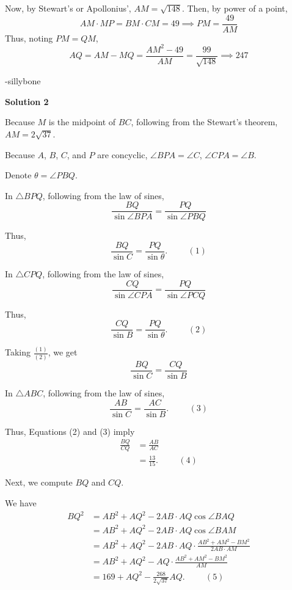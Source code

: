 \begin{enumerate}
 Now, by Stewart's or Apollonius', $AM = \sqrt{148}$. Then, by power of a point, 
 \[AM \cdot MP = BM \cdot CM = 49 \implies PM = \frac{49}{AM}\] Thus, noting $PM = QM$, 
 \[AQ = AM - MQ = \frac{AM^2-49}{AM} = \frac{99}{\sqrt{148}} \implies \boxed{247}\]

 -sillybone

 



\textbf{Solution 2}

Because $M$ is the midpoint of $BC$, following from the Stewart's theorem, $AM = 2 \sqrt{37}$.

 Because $A$, $B$, $C$, and $P$ are concyclic, $\angle BPA = \angle C$, $\angle CPA = \angle B$.

 Denote $\theta = \angle PBQ$.

 In $\triangle BPQ$, following from the law of sines,
 \[ \frac{BQ}{\sin \angle BPA} = \frac{PQ}{\sin \angle PBQ} \]

 Thus,
 \[ \frac{BQ}{\sin C} = \frac{PQ}{\sin \theta} . \hspace{1cm} (1) \]

 In $\triangle CPQ$, following from the law of sines,
 \[ \frac{CQ}{\sin \angle CPA} = \frac{PQ}{\sin \angle PCQ} \]

 Thus,
 \[ \frac{CQ}{\sin B} = \frac{PQ}{\sin \theta} . \hspace{1cm} (2) \]

 Taking $\frac{(1)}{(2)}$, we get
 \[ \frac{BQ}{\sin C} = \frac{CQ}{\sin B} \]

 In $\triangle ABC$, following from the law of sines,
 \[ \frac{AB}{\sin C} = \frac{AC}{\sin B} . \hspace{1cm} (3) \]

 Thus, Equations (2) and (3) imply
 \begin{align*} \frac{BQ}{CQ} & = \frac{AB}{AC} \\ & = \frac{13}{15} . \hspace{1cm} (4) \end{align*}


 


 Next, we compute $BQ$ and $CQ$.

 We have
 \begin{align*} BQ^2 & = AB^2 + AQ^2 - 2 AB\cdot AQ \cos \angle BAQ \\ & = AB^2 + AQ^2 - 2 AB\cdot AQ \cos \angle BAM \\ & = AB^2 + AQ^2 - 2 AB\cdot AQ \cdot \frac{AB^2 + AM^2 - BM^2}{2 AB \cdot AM} \\ & = AB^2 + AQ^2 -  AQ \cdot \frac{AB^2 + AM^2 - BM^2}{AM} \\ & = 169 + AQ^2 - \frac{268}{2 \sqrt{37}} AQ .  \hspace{1cm} (5) \end{align*}



\end{enumerate}
